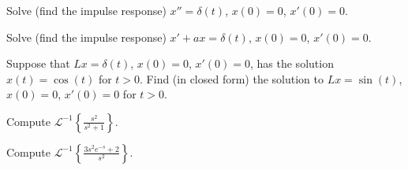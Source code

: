 \begin{exercise}
Solve (find the impulse response)
$x'' = \delta(t)$, $x(0) = 0$, $x'(0)=0$.
\end{exercise}

\begin{exercise}
Solve (find the impulse response)
$x' + a x = \delta(t)$, $x(0) = 0$, $x'(0)=0$.
\end{exercise}

\begin{exercise}
Suppose that $L x = \delta(t)$, $x(0) = 0$, $x'(0) = 0$, has the solution
$x(t) = \cos(t)$ for $t > 0$.  Find (in closed form) the solution to
$Lx = \sin(t)$, $x(0) = 0$, $x'(0) = 0$ for $t > 0$.
\end{exercise}

\begin{exercise}
Compute
${\mathcal{L}}^{-1} \left\{ \frac{s^2}{s^2+1} \right\}$.
\end{exercise}

\begin{exercise}
Compute
${\mathcal{L}}^{-1} \left\{ \frac{3 s^2 e^{-s} + 2}{s^2} \right\}$.
\end{exercise}
